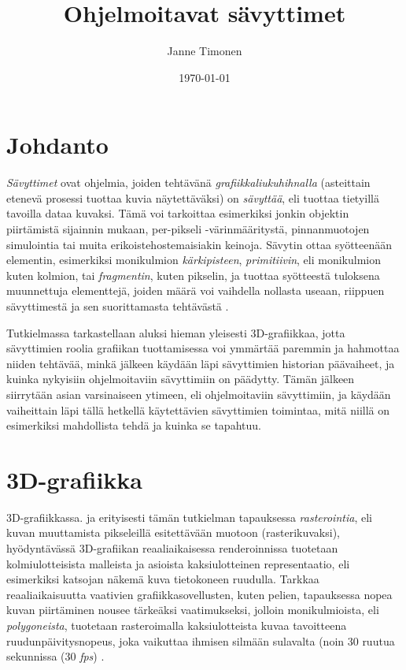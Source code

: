 \documentclass[finnish]{tktltiki2}
\title{Ohjelmoitavat sävyttimet}
\author{Janne Timonen}
\date{\today}
\theoremstyle{definition}
\theoremstyle{remark}
\begin{document}

\frontmatter      %

\maketitle        %
\makeabstract     %

\tableofcontents  %


\mainmatter       %

\section{Johdanto}


\emph{Sävyttimet} ovat ohjelmia, joiden tehtävänä \emph{grafiikkaliukuhihnalla} (asteittain etenevä prosessi tuottaa kuvia näytettäväksi) on \emph{sävyttää}, eli tuottaa tietyillä tavoilla dataa kuvaksi. Tämä voi tarkoittaa esimerkiksi jonkin objektin piirtämistä sijainnin mukaan, per-pikseli -värinmääritystä, pinnanmuotojen simulointia tai muita erikoistehostemaisiakin keinoja. Sävytin ottaa syötteenään elementin, esimerkiksi monikulmion \emph{kärkipisteen}, \emph{primitiivin}, eli monikulmion kuten kolmion, tai \emph{fragmentin}, kuten pikselin, ja tuottaa syötteestä tuloksena muunnettuja elementtejä, joiden määrä voi vaihdella nollasta useaan, riippuen sävyttimestä ja sen suorittamasta tehtävästä \cite{Gre14}.

Tutkielmassa tarkastellaan aluksi hieman yleisesti 3D-grafiikkaa, jotta sävyttimien roolia grafiikan tuottamisessa voi ymmärtää paremmin ja hahmottaa niiden tehtävää, minkä jälkeen käydään läpi sävyttimien historian päävaiheet, ja kuinka nykyisiin ohjelmoitaviin sävyttimiin on päädytty. Tämän jälkeen siirrytään asian varsinaiseen ytimeen, eli ohjelmoitaviin sävyttimiin, ja käydään vaiheittain läpi tällä hetkellä käytettävien sävyttimien toimintaa, mitä niillä on esimerkiksi mahdollista tehdä ja kuinka se tapahtuu.

\section{3D-grafiikka}

3D-grafiikkassa. ja erityisesti tämän tutkielman tapauksessa \emph{rasterointia}, eli kuvan muuttamista pikseleillä esitettävään muotoon (rasterikuvaksi), hyödyntävässä 3D-grafiikan reaaliaikaisessa renderoinnissa tuotetaan kolmiulotteisista malleista ja asioista kaksiulotteinen representaatio, eli esimerkiksi katsojan näkemä kuva tietokoneen ruudulla. Tarkkaa reaaliaikaisuutta vaativien grafiikkasovellusten, kuten pelien, tapauksessa nopea kuvan piirtäminen nousee tärkeäksi vaatimukseksi, jolloin monikulmioista, eli \emph{polygoneista}, tuotetaan rasteroimalla kaksiulotteista kuvaa tavoitteena ruudunpäivitysnopeus, joka vaikuttaa ihmisen silmään sulavalta (noin 30 ruutua sekunnissa (30 \emph{fps}) \cite{Gre14}. 
\end{document}
